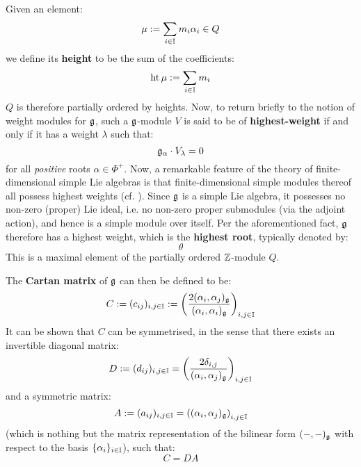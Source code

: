         Given an element:
            $$\mu := \sum_{i \in \mathbb{I}} m_i \alpha_i \in Q$$
        we define its \textbf{height} to be the sum of the coefficients:
            $$\operatorname{ht} \mu := \sum_{i \in \mathbb{I}} m_i$$
        $Q$ is therefore partially ordered by heights. Now, to return briefly to the notion of weight modules for $\mathfrak{g}$, such a $\mathfrak{g}$-module $V$ is said to be of \textbf{highest-weight} if and only if it has a weight $\lambda$ such that:
            $$\mathfrak{g}_{\alpha} \cdot V_{\lambda} = 0$$
        for all \textit{positive} roots $\alpha \in \Phi^+$. Now, a remarkable feature of the theory of finite-dimensional simple Lie algebras is that finite-dimensional simple modules thereof all possess highest weights (cf. \cite[Theorem 21.1, p. 112]{humphreys_lie_algebras}). Since $\mathfrak{g}$ is a simple Lie algebra, it possesses no non-zero (proper) Lie ideal, i.e. no non-zero proper submodules (via the adjoint action), and hence is a simple module over itself. Per the aforementioned fact, $\mathfrak{g}$ therefore has a highest weight, which is the \textbf{highest root}, typically denoted by:
            $$\theta$$
        This is a maximal element of the partially ordered $\mathbb{Z}$-module $Q$.
        
        The \textbf{Cartan matrix} of $\mathfrak{g}$ can then be defined to be:
            $$C := (c_{ij})_{i, j \in \mathbb{I}} := \left( \frac{2(\alpha_i, \alpha_j)_{\mathfrak{g}}}{(\alpha_i, \alpha_i)_{\mathfrak{g}}} \right)_{i, j \in \mathbb{I}}$$
        It can be shown that $C$ can be symmetrised, in the sense that there exists an invertible diagonal matrix:
            $$D := (d_{ij})_{i, j \in \mathbb{I}} = \left(\frac{2\delta_{i, j}}{(\alpha_i, \alpha_j)_{\mathfrak{g}}}\right)_{i, j \in \mathbb{I}}$$
        and a symmetric matrix:
            $$A := (a_{ij})_{i, j \in \mathbb{I}} = \left((\alpha_i, \alpha_j)_{\mathfrak{g}}\right)_{i, j \in \mathbb{I}}$$
        (which is nothing but the matrix representation of the bilinear form $(-, -)_{\mathfrak{g}}$ with respect to the basis $\{\alpha_i\}_{i \in \mathbb{I}}$), such that:
            $$C = DA$$

